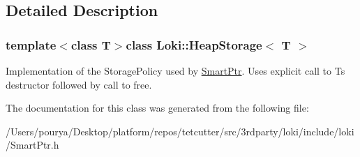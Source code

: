 \subsection{Detailed Description}
\subsubsection*{template$<$class T$>$class Loki\+::\+Heap\+Storage$<$ T $>$}

Implementation of the Storage\+Policy used by \hyperlink{classLoki_1_1SmartPtr}{Smart\+Ptr}. Uses explicit call to T\textquotesingle{}s destructor followed by call to free. 

The documentation for this class was generated from the following file\+:\begin{DoxyCompactItemize}
\item 
/\+Users/pourya/\+Desktop/platform/repos/tetcutter/src/3rdparty/loki/include/loki/Smart\+Ptr.\+h\end{DoxyCompactItemize}
